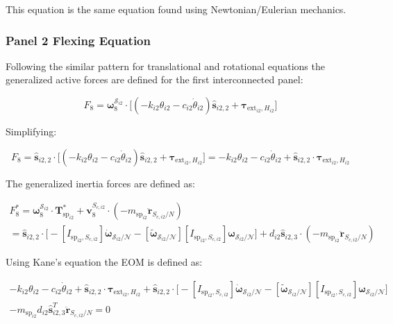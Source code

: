 This equation is the same equation found using Newtonian/Eulerian mechanics.

\subsubsection{Panel 2 Flexing Equation}
Following the similar pattern for translational and rotational equations the generalized active forces are defined for the first interconnected panel:

\begin{equation}
	F_{8} = \bm \omega_{8}^{\mathcal{S}_{i2}} \cdot \Big[  (-k_{i2} \theta_{i2} - c_{i2} \dot{\theta}_{i2})\bm{\hat{s}}_{i2,2} + \bm \tau_{\text{ext}_{i2},H_{i2}} \Big]
\end{equation}

Simplifying:

\begin{equation}
	F_{8} = \bm{\hat{s}}_{i2,2} \cdot \Big[  (-k_{i2} \theta_{i2} - c_{i2} \dot{\theta}_{i2})\bm{\hat{s}}_{i2,2} + \bm \tau_{\text{ext}_{i2},H_{i2}} \Big] = -k_{i2} \theta_{i2} - c_{i2} \dot{\theta}_{i2} + \bm{\hat{s}}_{i2,2} \cdot \bm \tau_{\text{ext}_{i2},H_{i2}}
\end{equation}

The generalized inertia forces are defined as:

\begin{multline}
	F^*_{8} = \bm \omega_{\textit{8}}^{\mathcal{S}_{i2}} \cdot \bm T^*_{\text{sp}_{i2}}  + \bm v^{S_{c,i2}}_{8} \cdot (-m_{\text{sp}_{i2}} \ddot{\bm{r}}_{S_{c,i2}/N}) \\
	= \bm{\hat{s}}_{i2,2} \cdot \Big[-[I_{\text{sp}_{i2},S_{c,i2}}] \dot{\bm\omega}_{\mathcal{S}_{i2}/\mathcal{N}}  -[\tilde{\bm \omega}_{\mathcal{S}_{i2}/\mathcal{N}}] [I_{\text{sp}_{i2},S_{c,i2}}] \bm \omega_{\mathcal{S}_{i2}/\mathcal{N}} \Big] + d_{i2}\bm{\hat{s}}_{i2,3} \cdot (-m_{\text{sp}_{i2}} \ddot{\bm{r}}_{S_{c,i2}/N})
\end{multline}

Using Kane's equation the EOM is defined as:

\begin{multline}
	-k_{i2} \theta_{i2} - c_{i2} \dot{\theta}_{i2} + \bm{\hat{s}}_{i2,2} \cdot \bm \tau_{\text{ext}_{i2},H_{i2}} + \bm{\hat{s}}_{i2,2} \cdot \Big[-[I_{\text{sp}_{i2},S_{c,i2}}] \dot{\bm\omega}_{\mathcal{S}_{i2}/\mathcal{N}}  -[\tilde{\bm \omega}_{\mathcal{S}_{i2}/\mathcal{N}}] [I_{\text{sp}_{i2},S_{c,i2}}] \bm \omega_{\mathcal{S}_{i2}/\mathcal{N}} \Big] \\
	- m_{\text{sp}_{i2}} d_{i2}\bm{\hat{s}}_{i2,3}^T \ddot{\bm{r}}_{S_{c,i2}/N} = 0
\end{multline}

